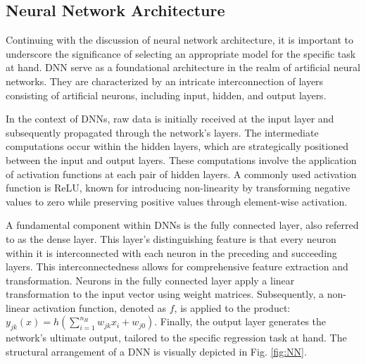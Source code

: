 \subsection{Neural Network Architecture}
Continuing with the discussion of neural network architecture, it is important to underscore the significance of selecting an appropriate model for the specific task at hand. \ac{DNN} serve as a foundational architecture in the realm of artificial neural networks. They are characterized by an intricate interconnection of layers consisting of artificial neurons, including input, hidden, and output layers.

In the context of DNNs, raw data is initially received at the input layer and subsequently propagated through the network's layers. The intermediate computations occur within the hidden layers, which are strategically positioned between the input and output layers. These computations involve the application of activation functions at each pair of hidden layers. A commonly used activation function is \ac{ReLU}\cite{sunFormalVerificationStochastic2022}, known for introducing non-linearity by transforming negative values to zero while preserving positive values through element-wise activation. 

A fundamental component within DNNs is the fully connected layer, also referred to as the dense layer\cite{goodfellowDeepLearning2016}. This layer's distinguishing feature is that every neuron within it is interconnected with each neuron in the preceding and succeeding layers. This interconnectedness allows for comprehensive feature extraction and transformation. Neurons in the fully connected layer apply a linear transformation to the input vector using weight matrices. Subsequently, a non-linear activation function, denoted as $f$, is applied to the product: $y_{jk}(x)=h\left(\sum_{i=1}^{n_H} w_{j k} x_i+w_{j0}\right)$. Finally, the output layer generates the network's ultimate output, tailored to the specific regression task at hand. The structural arrangement of a DNN is visually depicted in Fig. \ref{fig:NN}.


